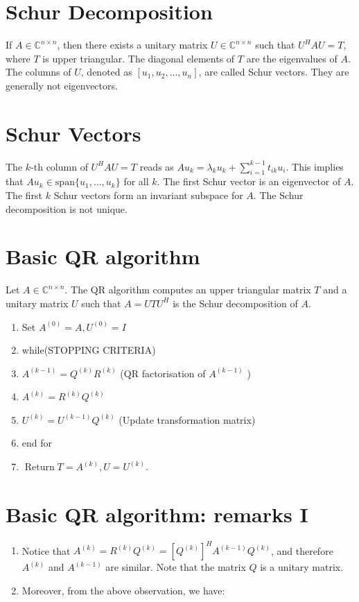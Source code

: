 \documentclass[11pt]{book}
\begin{document}
\section*{Schur Decomposition}
If $A \in \mathbb{C}^{n \times n}$, then there exists a unitary matrix $U \in \mathbb{C}^{n \times n}$ such that $U^H AU = T$, where $T$ is upper triangular. The diagonal elements of $T$ are the eigenvalues of $A$. The columns of $U$, denoted as $[u_1, u_2, \ldots, u_n]$, are called Schur vectors. They are generally not eigenvectors.
\section*{Schur Vectors}
The $k$-th column of $U^H AU = T$ reads as $A u_k = \lambda_k u_k + \sum_{i=1}^{k-1} t_{ik} u_i$. This implies that $A u_k \in \text{span} \{u_1, \ldots, u_k\}$ for all $k$. The first Schur vector is an eigenvector of $A$. The first $k$ Schur vectors form an invariant subspace for $A$. The Schur decomposition is not unique.

\section*{Basic QR algorithm}
Let $A \in \mathbb{C}^{n \times n}$. The QR algorithm computes an upper triangular matrix $T$ and a unitary matrix $U$ such that $A=U T U^{H}$ is the Schur decomposition of $A$.
\begin{enumerate}
  \item Set $A^{(0)}=A, U^{(0)}=I$

  \item while(STOPPING CRITERIA)

  \item $A^{(k-1)}=Q^{(k)} R^{(k)}$ (QR factorisation of $A^{(k-1)}$ )

  \item $A^{(k)}=R^{(k)} Q^{(k)}$

  \item $U^{(k)}=U^{(k-1)} Q^{(k)}$ (Update transformation matrix)

  \item end for

  \item $\operatorname{Return} T=A^{(k)}, U=U^{(k)}$.

\end{enumerate}

\section*{Basic QR algorithm: remarks I}
\begin{enumerate}
  \item Notice that $A^{(k)}=R^{(k)} Q^{(k)}=\left[Q^{(k)}\right]^{H} A^{(k-1)} Q^{(k)}$, and therefore $A^{(k)}$ and $A^{(k-1)}$ are similar. Note that the matrix $Q$ is a unitary matrix.

  \item Moreover, from the above observation, we have:

\end{enumerate}
\end{document}
